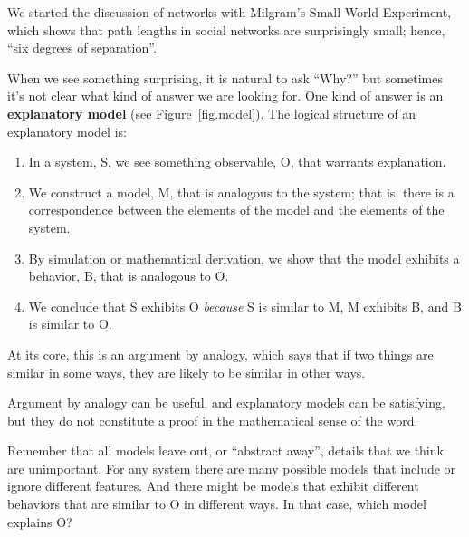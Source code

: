 \documentclass[12pt]{book}
\theoremstyle{exercise}
\begin{document}
We started the discussion of networks with Milgram's Small World
Experiment, which shows that path lengths in social
networks are surprisingly small; hence, ``six degrees of separation''.


When we see something surprising, it is natural to ask ``Why?''  but
sometimes it's not clear what kind of answer we are looking for.  One
kind of answer is an {\bf explanatory model} (see
Figure~\ref{fig.model}).  The logical structure of an explanatory
model is:

\begin{enumerate}

\item In a system, S, we see something observable, O, that warrants
  explanation.

\item We construct a model, M, that is analogous to the system; that
  is, there is a correspondence between the elements of the model and
  the elements of the system.

\item By simulation or mathematical derivation, we show that the model
  exhibits a behavior, B, that is analogous to O.

\item We conclude that S exhibits O {\em because} S is similar to M, M
  exhibits B, and B is similar to O.

\end{enumerate}

At its core, this is an argument by analogy, which says that if two
things are similar in some ways, they are likely to be similar in
other ways.


Argument by analogy can be useful, and explanatory models can be
satisfying, but they do not constitute a proof in the mathematical
sense of the word.


Remember that all models leave out, or ``abstract away'',
details that we think are unimportant.  For any system there
are many possible models that include or ignore different features.
And there might be models that exhibit different behaviors that are similar to O in different ways.
In that case, which model explains O?
\end{document}
